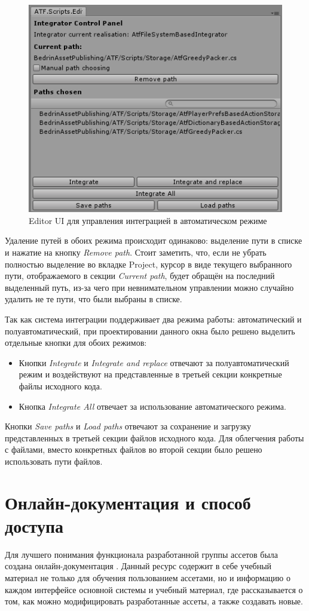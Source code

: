 \begin{figure}[H]
	\centering
	\includegraphics[width=0.7\linewidth]{integrator_automatic.PNG}
	\caption{Editor UI для управления интеграцией в автоматическом режиме}
	\label{integratorUIAutomatic}
\end{figure}

Удаление путей в обоих режима происходит одинаково: выделение пути в списке и нажатие на кнопку \textit{Remove path}. Стоит заметить, что, если не убрать полностью выделение во вкладке Project, курсор в виде текущего выбранного пути, отображаемого в секции \textit{Current path}, будет обращён на последний выделенный путь, из-за чего при невнимательном управлении можно случайно удалить не те пути, что были выбраны в списке.

Так как система интеграции поддерживает два режима работы: автоматический и полуавтоматический, при проектировании данного окна было решено выделить отдельные кнопки для обоих режимов:
\begin{itemize}
	\item
	Кнопки \textit{Integrate} и \textit{Integrate and replace} отвечают за полуавтоматический режим и воздействуют на представленные в третьей секции конкретные файлы исходного кода.
	\item
	Кнопка \textit{Integrate All} отвечает за использование автоматического режима.
\end{itemize}

Кнопки \textit{Save paths} и \textit{Load paths} отвечают за сохранение и загрузку представленных в третьей секции файлов исходного кода. Для облегчения работы с файлами, вместо конкретных файлов во второй секции было решено использовать пути файлов.

\section{Онлайн-документация и способ доступа}
Для лучшего понимания функционала разработанной группы ассетов была создана онлайн-документация \cite{atf_docs}. Данный ресурс содержит в себе учебный материал не только для обучения пользованием ассетами, но и информацию о каждом интерфейсе основной системы и учебный материал, где рассказывается о том, как можно модифицировать разработанные ассеты, а также создавать новые. 

